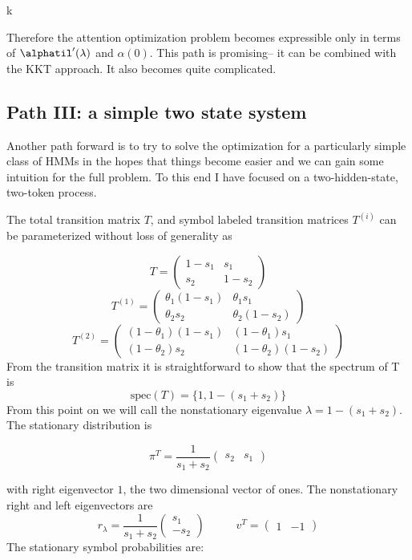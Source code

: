 k\documentclass{article}
\begin{document}
Therefore the attention optimization problem becomes expressible only in terms of $\alphatil'(\lambda)$ and $\alpha(0)$. This path is promising-- it can be combined with the KKT approach. It also becomes quite complicated. 

\subsection{Path III: a simple two state system}
Another path forward is to try to solve the optimization for a particularly simple class of HMMs in the hopes that things become easier and we can gain some intuition for the full problem. To this end I have focused on a two-hidden-state, two-token process. 

The total transition matrix $T$, and symbol labeled transition matrices $T^{(i)}$ can be parameterized without loss of generality as 

$$
T = \begin{pmatrix}
1-s_1 & s_1\\
s_2 & 1-s_2
\end{pmatrix}
$$
$$
T^{(1)} = \begin{pmatrix}
\theta_1(1-s_1) & \theta_1s_1 \\
\theta_2 s_2 & \theta_2(1-s_2)
\end{pmatrix}
$$
$$
T^{(2)} = \begin{pmatrix}
(1-\theta_1)(1-s_1) & (1-\theta_1)s_1 \\
(1-\theta_2) s_2 & (1-\theta_2)(1-s_2)
\end{pmatrix}
$$
From the transition matrix it is straightforward to show that the spectrum of T is 
$$
\text{spec}(T) = \{1, 1- (s_1+s_2) \}
$$
From this point on we will call the nonstationary eigenvalue $\lambda = 1 - (s_1 + s_2)$. The stationary distribution is

$$
\pi^T = \frac{1}{s_1 + s_2}\begin{pmatrix}
s_2 & s_1
\end{pmatrix}
$$

with right eigenvector $1$, the two dimensional vector of ones. The nonstationary right and left eigenvectors are 
$$
r_\lambda = \frac{1}{s_1+s_2}\begin{pmatrix}
	s_1 \\ -s_2 
\end{pmatrix} \;\;\;\;\;\;\;\;\;\;
v^T = 
\begin{pmatrix}
	1 & -1 
\end{pmatrix}
$$
The stationary symbol probabilities are:
\end{document}
